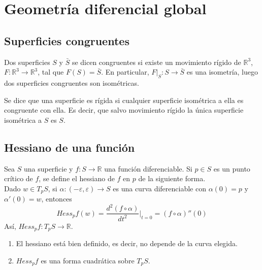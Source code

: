 \chapter{Geometría diferencial global}
\section{Superficies congruentes}

\begin{definition}
    Dos superficies $S$ y $\bar{S}$ se dicen congruentes si existe un movimiento rígido de $\mathbb{R}^3$, $F : \mathbb{R}^3 \to \mathbb{R}^3$, tal que $F(S) = \bar{S}$.
    En particular, $F|_S : S \to \bar{S}$ es una isometría, luego dos superficies congruentes son isométricas.
\end{definition}

\begin{definition}
    Se dice que una superficie es rígida si cualquier superficie isométrica a ella es congruente con ella. Es decir, que salvo movimiento rígido la única superficie isométrica a $S$ es $S$.
\end{definition}

\section{Hessiano de una función}

\begin{definition}
    Sea $S$ una superficie y $f : S \to \mathbb{R}$ una función diferenciable.
    Si $p \in S$ es un punto crítico de $f$, se define el hessiano de $f$ en $p$ de la siguiente forma.\\
    Dado $w \in T_pS$, si $\alpha : (-\varepsilon, \varepsilon) \to S$ es una curva diferenciable con $\alpha(0) = p$ y $\alpha'(0) = w$, entonces
    $$Hess_pf(w) = \frac{d^2(f \circ \alpha)}{dt^2}|_{t=0} = (f \circ \alpha)''(0)$$
    Así, $Hess_pf : T_pS \to \mathbb{R}$.
\end{definition}

\begin{proposition}
    \hfill
    \begin{enumerate}
        \item El hessiano está bien definido, es decir, no depende de la curva elegida.
        \item $Hess_pf$ es una forma cuadrática sobre $T_pS$.
    \end{enumerate}
\end{proposition}

